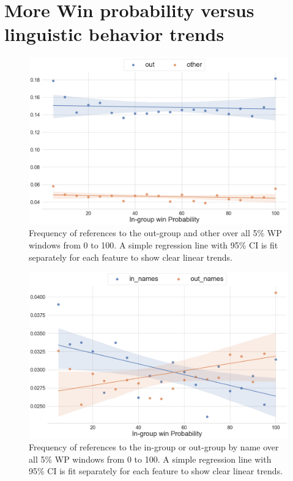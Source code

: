 \chapter{More Win probability versus linguistic behavior trends}
\label{appendix:figs}

\begin{figure}[t]
     \centering
     \includegraphics[width=\linewidth]{figures/trends-3.png}
     \caption{Frequency of references to the out-group and other over all 5\% WP windows from 0 to 100. A simple regression line with 95\% CI is fit separately for each feature to show clear linear trends.}
     \label{fig:trends-3}
 \end{figure}


\begin{figure}[t]
      \centering
      \includegraphics[width=\linewidth]{figures/trends-4.png}
      \caption{Frequency of references to the in-group or out-group by name over all 5\% WP windows from 0 to 100. A simple regression line with 95\% CI is fit separately for each feature to show clear linear trends.}
      \label{fig:trends-4}
  \end{figure}
